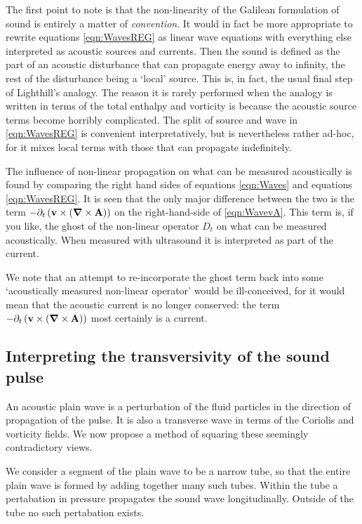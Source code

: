 \documentclass[10pt, fleqn,draft,showtrims,oldfontcommands]{article} %
\newcommand{\eqnref}[1]{\ref{eqn:#1}}
\newcommand{\lr}[1]{\left( #1 \right)}
\renewcommand{\d}{\partial}
\newcommand{\del}{\nabla}
\newcommand{\vdel}{ \mbox{\boldmath $\del$}}
\newcommand{\dt}{{\d_t}}
\newcommand{\Dt}{D_t}
\newcommand{\vA}{\textbf{A}}
\newcommand{\vv}{\textbf{v}}
\begin{document}
The first point to note is that the non-linearity of the Galilean formulation of sound is entirely a matter of {\em  convention}.
It would in fact be more appropriate to rewrite equations \eqnref{WavesREG} as linear wave equations with everything else interpreted as acoustic sources and currents.
Then the sound is defined as the part of an acoustic disturbance that can propagate energy away to infinity,
the rest of the disturbance being a `local' source.
This is, in fact, the usual final step of Lighthill's analogy.
The reason it is rarely performed when the analogy is written in terms of the total enthalpy and vorticity is because
the acoustic source terms become horribly complicated.
The split of source and wave in \eqnref{WavesREG} is convenient  interpretatively, but is nevertheless rather ad-hoc,
for it mixes local terms with those that can propagate indefinitely.

The influence of non-linear propagation on what can be measured acoustically is found by comparing the right hand sides of equations \eqnref{Waves} and equations \eqnref{WavesREG}.
It is seen that the only major difference between the two is the term $- \dt \lr{ \vv \times \lr{\vdel \times \vA}}$ on the right-hand-side of \eqnref{WavevA}.
This term is, if you like, the ghost of the non-linear operator $\Dt$ on what can be measured acoustically.
When measured with ultrasound it is interpreted  as part of the current.

We note that an attempt to re-incorporate the ghost  term back into some `acoustically measured non-linear operator' would be ill-conceived, 
for it would mean that the acoustic current is no longer conserved:
the term $- \dt \lr{ \vv \times \lr{\vdel \times \vA}}$ most certainly is a current.






\subsection{Interpreting the transversivity of the sound pulse} \label{sec:transversivity}


An acoustic plain wave is  a  perturbation of the fluid particles in the direction of propagation of the pulse.
It is also a transverse wave in terms of the Coriolis and vorticity fields.
We now propose a method of squaring these seemingly contradictory views.

We consider a segment of the plain wave to be a narrow tube,
so that the entire plain wave is formed by adding together many such tubes.
Within the tube a pertabation in pressure propagates the sound wave longitudinally.
Outside of the tube no such pertabation exists.
\end{document}
